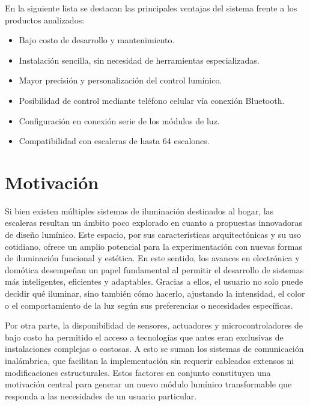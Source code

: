 En la siguiente lista se destacan las principales ventajas del sistema frente a los productos analizados:
\begin{itemize}
    \item Bajo costo de desarrollo y mantenimiento.
    \item Instalación sencilla, sin necesidad de herramientas especializadas.
    \item Mayor precisión y personalización del control lumínico.
    \item Posibilidad de control mediante teléfono celular vía conexión Bluetooth.
    \item Configuración en conexión serie de los módulos de luz.
    \item Compatibilidad con escaleras de hasta 64 escalones.
\end{itemize}

\section{Motivación}

Si bien existen múltiples sistemas de iluminación destinados al hogar, las escaleras resultan un ámbito poco explorado en cuanto a propuestas innovadoras de diseño lumínico. Este espacio, por sus características arquitectónicas y su uso cotidiano, ofrece un amplio potencial para la experimentación con nuevas formas de iluminación funcional y estética. En este sentido, los avances en electrónica y domótica desempeñan un papel fundamental al permitir el desarrollo de sistemas más inteligentes, eficientes y adaptables. Gracias a ellos, el usuario no solo puede decidir qué iluminar, sino también cómo hacerlo, ajustando la intensidad, el color o el comportamiento de la luz según sus preferencias o necesidades específicas.

Por otra parte, la disponibilidad de sensores, actuadores y microcontroladores de bajo costo ha permitido el acceso a tecnologías que antes eran exclusivas de instalaciones complejas o costosas. A esto se suman los sistemas de comunicación inalámbrica, que facilitan la implementación sin requerir cableados extensos ni modificaciones estructurales. Estos factores en conjunto constituyen una motivación central para generar un nuevo módulo lumínico transformable que responda a las necesidades de un usuario particular. 



